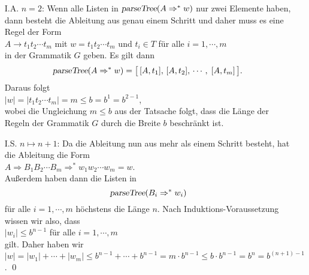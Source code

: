 \begin{enumerate}
\item[I.A.] $n=2$:  Wenn alle Listen in $\textsl{parseTree}(A \Rightarrow^* w)$ 
            nur zwei Elemente haben, dann besteht die Ableitung aus genau einem Schritt
            und daher muss es eine Regel der Form 
            \\[0.2cm]
            \hspace*{1.3cm}
            $A \rightarrow t_1t_2 \cdots t_m$ \quad mit $w = t_1t_2 \cdots t_m$ und $t_i \in T$
            f\"ur alle $i=1,\cdots,m$
            \\[0.2cm]
            in der Grammatik $G$ geben.  Es gilt dann
            \[ \textsl{parseTree}(A \Rightarrow^* w) = 
               \bigl[\, [A,t_1],\, [A,t_2],\, \cdots,\; [A,t_m]\, \bigr].\, 
            \]
            Daraus folgt
            \\[0.2cm]
            \hspace*{1.3cm}
            $|w| = |t_1t_2 \cdots t_m| = m \leq b = b^{1} = b^{2-1}$,
            \\[0.2cm]
            wobei die Ungleichung $m \leq b$ aus der Tatsache folgt, dass die L\"ange der Regeln der Grammatik
            $G$ durch die Breite $b$ beschr\"ankt ist.
\item[I.S.] $n \mapsto n+1$: Da die Ableitung nun aus mehr als einem Schritt besteht, hat die Ableitung die Form
            \\[0.2cm]
            \hspace*{1.3cm}
            $A \Rightarrow B_1 B_2 \cdots B_m \Rightarrow^* w_1 w_2 \cdots w_m = w$.
            \\[0.2cm]
            Au{\ss}erdem haben dann die Listen in
            \[ 
               \textsl{parseTree}(B_i \Rightarrow^* w_i) 
            \]
            f\"ur alle $i=1,\cdots,m$ h\"ochstens die L\"ange $n$.
            Nach Induktions-Voraussetzung wissen wir also, dass
            \\[0.2cm]
            \hspace*{1.3cm}
            $|w_i| \leq b^{n-1}$ \quad f\"ur alle $i=1,\cdots,m$
            \\[0.2cm]
            gilt.  Daher haben wir
            \\[0.2cm]
            \hspace*{1.3cm}
            $|w| = |w_1| + \cdots + |w_m| \leq b^{n-1} + \cdots + b^{n-1} = 
             m \cdot b^{n-1} \leq b \cdot b^{n-1} = b^{n} = b^{(n+1)-1}
            $. \qed
\end{enumerate}

